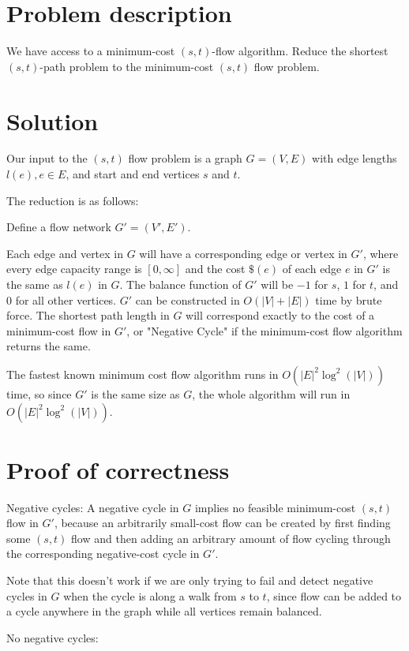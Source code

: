 \documentclass{article}
\begin{document}
\section{Problem description}

We have access to a minimum-cost $(s,t)$-flow algorithm. Reduce the shortest
$(s,t)$-path problem to the minimum-cost $(s,t)$ flow problem.

\section{Solution}

Our input to the $(s,t)$ flow problem is a graph $G = (V,E)$ with edge
lengths $l(e), e \in E$, and start and end vertices $s$ and $t$.

The reduction is as follows:

Define a flow network $G' = (V', E')$. 

Each edge and vertex in $G$ will have a corresponding edge or vertex in $G'$, where
every edge capacity range is $[0, \infty]$ and the cost $\$(e)$ of each edge $e$ in
$G'$ is the same as $l(e)$ in $G$. The balance function of $G'$ will be $-1$ for
$s$, $1$ for $t$, and 0 for all other vertices. $G'$ can be constructed in
$O(|V| + |E|)$ time by brute force. The shortest path length in
$G$ will correspond exactly to the cost of a minimum-cost flow in $G'$, or "Negative
Cycle" if the minimum-cost flow algorithm returns the same.

The fastest known minimum cost flow algorithm runs in $O(|E|^2 \log^2(|V|))$
time, so since $G'$ is the same size as $G$, the whole algorithm will run in
$O(|E|^2 \log^2(|V|))$.

\section{Proof of correctness}

Negative cycles: A negative cycle in $G$ implies no feasible minimum-cost
$(s,t)$ flow in $G'$, because an arbitrarily small-cost flow can be created by
first finding some $(s,t)$ flow and then adding an arbitrary amount of flow
cycling through the corresponding negative-cost cycle in $G'$.

Note that this doesn't work if we are only trying to fail and detect negative
cycles in $G$ when the cycle is along a walk from $s$ to $t$, since flow can
be added to a cycle anywhere in the graph while all vertices remain balanced.

No negative cycles:
\end{document}
